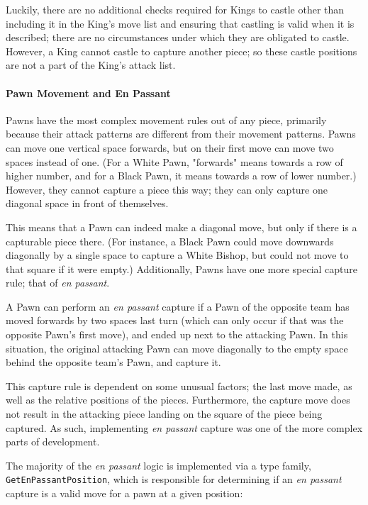 \documentclass[12pt, a4paper, bibliography=totocnumbered]{scrreprt}
\newcommand{\inline}[1]{\lstinline[basicstyle=\ttfamily\footnotesize]{#1}}
\begin{document}
Luckily, there are no additional checks required for Kings to castle other than including it in the King's move list and ensuring that castling is valid when it is described; there are no circumstances under which they are obligated to castle. However, a King cannot castle to capture another piece; so these castle positions are not a part of the King's attack list.

\paragraph{Pawn Movement and En Passant} \label{passantsection}

Pawns have the most complex movement rules out of any piece, primarily because their attack patterns are different from their movement patterns. Pawns can move one vertical space forwards, but on their first move can move two spaces instead of one. (For a White Pawn, "forwards" means towards a row of higher number, and for a Black Pawn, it means towards a row of lower number.) However, they cannot capture a piece this way; they can only capture one diagonal space in front of themselves.


This means that a Pawn can indeed make a diagonal move, but only if there is a capturable piece there. (For instance, a Black Pawn could move downwards diagonally by a single space to capture a White Bishop, but could not move to that square if it were empty.) Additionally, Pawns have one more special capture rule; that of \emph{en passant}.

A Pawn can perform an \emph{en passant} capture if a Pawn of the opposite team has moved forwards by two spaces last turn (which can only occur if that was the opposite Pawn's first move), and ended up next to the attacking Pawn. In this situation, the original attacking Pawn can move diagonally to the empty space behind the opposite team's Pawn, and capture it.


This capture rule is dependent on some unusual factors; the last move made, as well as the relative positions of the pieces. Furthermore, the capture move does not result in the attacking piece landing on the square of the piece being captured. As such, implementing \emph{en passant} capture was one of the more complex parts of development.

The majority of the \emph{en passant} logic is implemented via a type family, \inline{GetEnPassantPosition}, which is responsible for determining if an \emph{en passant} capture is a valid move for a pawn at a given position:
\end{document}
